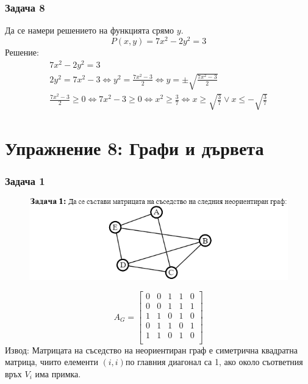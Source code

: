 \documentclass[fleqn, 12pt]{article}
\theoremstyle{definition}
\begin{document}
\subsubsection*{Задача 8}
Да се намери решението на функцията срямо $y$. 
$$P(x,y) = 7x^2 - 2y^2 = 3$$
Решение: 
\begin{gather*}
7x^2 - 2y^2 = 3\\
2y^2 = 7x^2 - 3 \Leftrightarrow y^2 = \frac{7x^2 - 3}{2} \Leftrightarrow y = \pm \sqrt{\frac{7x^2 - 3}{2}} \\
\frac{7x^2 - 3}{2} \geq 0 \Leftrightarrow 7x^2 - 3 \geq 0 \Leftrightarrow x^2 \geq \frac{3}{7} \Leftrightarrow x \geq \sqrt{\frac{3}{7}} \lor x \leq - \sqrt{\frac{3}{7}}
\end{gather*}
\newpage
\section{Упражнение 8: Графи и дървета}

\subsubsection*{Задача 1}
\begin{figure} [htp!]
\includegraphics[width = \linewidth]{Pics/Discrete math/ex8/ex8-task1.png}
\end{figure}
$$A_G = 
\begin{bmatrix}
0 & 0 & 1 & 1 & 0 \\
0 & 0 & 1 & 1 & 1 \\
1 & 1 & 0 & 1 & 0 \\
0 & 1 & 1 & 0 & 1 \\
1 & 1 & 0 & 1 & 0 \\
\end{bmatrix}
$$
Извод: Матрицата на съседство на неориентиран граф е симетрична квадратна матрица, чиито елементи $(i,i)$по главния диагонал са 1, ако около съответния връх $V_i$ има примка.
\end{document}
